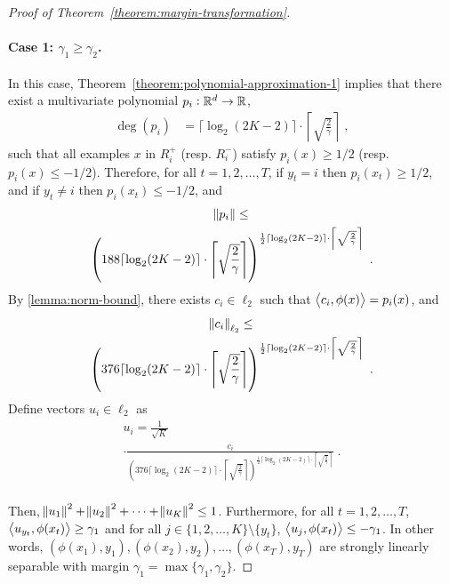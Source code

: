 \begin{proof}[Proof of Theorem~\ref{theorem:margin-transformation}]
\paragraph{Case 1: $\gamma_1 \geq \gamma_2$.} In this case, Theorem~\ref{theorem:polynomial-approximation-1}
implies that there exist a multivariate polynomial $p_i:\mathbb{R}^d \to \mathbb{R}$,
\begin{align*}
\deg(p_i) & = \lceil \log_2(2K-2) \rceil \cdot \left\lceil \sqrt{\frac{2}{\gamma}} \right\rceil \; ,
\end{align*}
such that all examples $x$ in $R_i^+$ (resp. $R_i^-$) satisfy $p_i(x) \geq 1/2$
(resp. $p_i(x) \leq -1/2$).
Therefore, for all $t=1,2,\dots,T$, if $y_t = i$ then $p_i(x_t) \ge 1/2$,
 and if $y_t \neq i$ then $p_i(x_t) \le -1/2$, and
\begin{multline*}
\norm{p_i} \le \\
\left(188 \lceil \log_2(2K-2) \rceil \cdot \left \lceil \sqrt{\frac{2}{\gamma}} \right \rceil \right)^{\frac{1}{2} \lceil \log_2(2K-2) \rceil
\cdot \left \lceil \sqrt{\frac{2}{\gamma}} \right \rceil} \; .
\end{multline*}
By \autoref{lemma:norm-bound}, there exists $c_i \in \ell_2$ such that
$\left\langle c_i, \phi(x) \right\rangle = p_i(x)$, and
\begin{multline*}
\norm{c_i}_{\ell_2} \le \\
\left(376 \lceil \log_2(2K-2) \rceil \cdot \left \lceil \sqrt{\frac{2}{\gamma}} \right \rceil \right)^{\frac{1}{2} \lceil \log_2(2K-2) \rceil
\cdot \left \lceil \sqrt{\frac{2}{\gamma}} \right \rceil} \; .
\end{multline*}
Define vectors $u_i \in \ell_2$ as
\begin{multline*}
u_i = \frac{1}{\sqrt{K}} \\
\cdot \frac{c_i}{\left(376 \lceil \log_2(2K-2) \rceil \cdot \left \lceil \sqrt{\frac{2}{\gamma}} \right \rceil \right)^{\frac{1}{2} \lceil \log_2(2K-2) \rceil
\cdot \left \lceil \sqrt{\frac{2}{\gamma}} \right \rceil}} \; . \\
\end{multline*}

Then, $\norm{u_1}^2 + \norm{u_2}^2 + \dots + \norm{u_K}^2 \le 1$.
Furthermore, for all $t=1,2,\dots,T$, $\left\langle u_{y_t}, \phi(x_t) \right\rangle \ge \gamma_1$
and for all $j \in \{1,2,\dots,K\} \setminus \{y_t\}$,
$\left\langle u_j, \phi(x_t) \right\rangle \le - \gamma_1$. In other words,
$(\phi(x_1), y_1), (\phi(x_2), y_2), \dots, (\phi(x_T), y_T)$ are
strongly linearly separable with margin $\gamma_1 = \max\{\gamma_1, \gamma_2\}$.


\end{proof}
